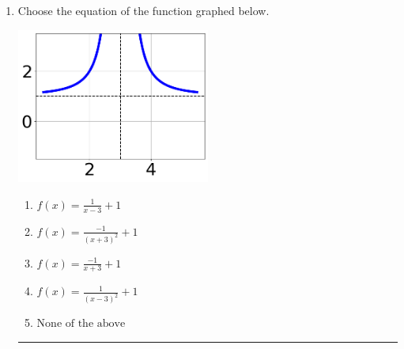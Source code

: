 \documentclass[14pt]{extbook}
\newcommand{\litem}[1]{\item#1\hspace*{-1cm}\rule{\textwidth}{0.4pt}}
\begin{document}
\begin{enumerate}
{\begin{enumerate}[label=\Alph*.]
\end{enumerate} }
\litem{
Choose the equation of the function graphed below.
\begin{center}
    \includegraphics[width=0.5\textwidth]{../Figures/rationalGraphToEquationCopyB.png}
\end{center}
\begin{enumerate}[label=\Alph*.]
\item \( f(x) = \frac{1}{x - 3} + 1 \)
\item \( f(x) = \frac{-1}{(x + 3)^2} + 1 \)
\item \( f(x) = \frac{-1}{x + 3} + 1 \)
\item \( f(x) = \frac{1}{(x - 3)^2} + 1 \)
\item \( \text{None of the above} \)

\end{enumerate} }
\end{enumerate}
\end{document}
